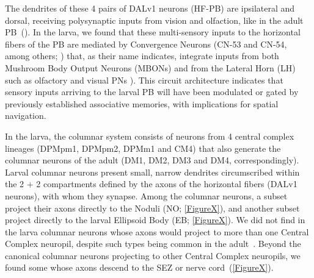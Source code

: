 The dendrites of these 4 pairs of DALv1 neurons (HF-PB) are ipsilateral and dorsal, receiving polysynaptic inputs from vision and olfaction, like in the adult PB~(\citep{hulse2021connectome}). In the larva, we found that these multi-sensory inputs to the horizontal fibers of the PB are mediated by Convergence Neurons (CN-53 and CN-54, among others; \citealp{eschbach2021}) that, as their name indicates, integrate inputs from both Mushroom Body Output Neurons (MBONs) and from the Lateral Horn (LH) such as olfactory and visual PNs \citep{EsbachFushiki2021}). This circuit architecture indicates that sensory inputs arriving to the larval PB will have been modulated or gated by previously established associative memories, with implications for spatial navigation.



In the larva, the columnar system consists of neurons from 4 central complex lineages (DPMpm1, DPMpm2, DPMm1 and CM4) that also generate the columnar neurons of the adult (DM1, DM2, DM3 and DM4, correspondingly).
Larval columnar neurons present small, narrow dendrites circumscribed within the 2 + 2 compartments defined by the axons of the horizontal fibers (DALv1 neurons), with whom they synapse.
Among the columnar neurons, a subset project their axons directly to the Noduli (NO; \ref{FigureX}), and another subset project directly to the larval Ellipsoid Body (EB; \ref{FigureX}).
We did not find in the larva columnar neurons whose axons would project to more than one Central Complex neuropil, despite such types being common in the adult~\citep{wolff2015neuroarchitecture; wolff2018; hulse2021connectome}.
Beyond the canonical columnar neurons projecting to other Central Complex neuropils, we found some whose axons descend to the SEZ or nerve cord~(\ref{FigureX}).



